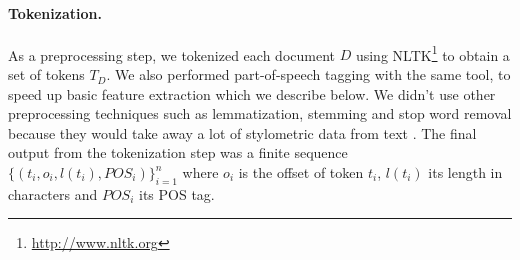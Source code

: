 \documentclass[10pt, a4paper]{article}
\begin{document}
\paragraph{Tokenization.} As a preprocessing step, we tokenized each document $D$ using NLTK\footnote{\url{http://www.nltk.org}} to obtain a set of tokens $T_D$. We also performed part-of-speech tagging with the same tool, to speed up basic feature extraction which we describe below. We didn't use other preprocessing techniques such as lemmatization, stemming and stop word removal because they would take away a lot of stylometric data from text \cite{stamatatos-2009a}. The final output from the tokenization step was a finite sequence $\{(t_i, o_i, l(t_i), \mathit{POS}_i)\}_{i=1}^n$ where $o_i$ is the offset of token $t_i$, $l(t_i)$ its length in characters and $\mathit{POS}_i$ its POS tag.
\end{document}

